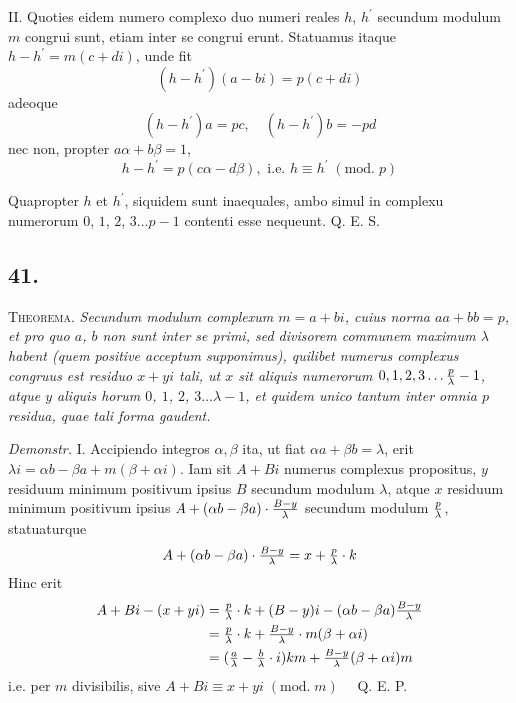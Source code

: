 \documentclass[twoside,12pt]{memoir}
\renewcommand{\pmod}[1]{\;(\textrm{mod.}\;#1)}
\let\oldfrac\frac
\def\frac#1#2{\mathchoice{\tfrac{#1}{#2}}{\oldfrac{#1}{#2}}{\genfrac{}{}{}{2}{#1}{#2\mathstrut}}{\genfrac{}{}{}{3}{#1}{#2\mathstrut}}}
\begin{document}
II. Quoties eidem numero complexo duo numeri reales \(h\), \(h^{\prime}\) secundum modulum \(m\) congrui sunt, etiam inter se congrui erunt. Statuamus itaque \(h-h^{\prime}=m(c+d i)\), unde fit
\[(h-h^{\prime})(a-b i)=p(c+d i)\]
adeoque
\[(h-h^{\prime}) a=p c, \quad (h-h^{\prime}) b=-p d\]
nec non, propter \(a \alpha+b \beta=1\),
\[h-h^{\prime}=p(c \alpha-d \beta), \text{ i.e. } h \equiv h^{\prime}\pmod{p}\]
 
Quapropter \(h\) et \(h^{\prime}\), siquidem sunt inaequales, ambo simul in complexu numerorum \(0\), \(1\), \(2\), \(3 \ldots p-1\) contenti esse nequeunt. Q. E. S.

\subsection*{41.}
 
\textsc{Theorema.}\textit{ Secundum modulum complexum \(m=a+b i\), cuius norma \(a a+b b=p\), et pro quo \(a\), \(b\) non sunt inter se primi, sed divisorem communem maximum \(\lambda\) habent (quem positive acceptum supponimus), quilibet numerus complexus congruus est residuo \(x+y i\) tali, ut \(x\) sit aliquis numerorum \(0,1,2,3 \ldots \frac{p}{\lambda}-1\), atque \(y\) aliquis horum \(0\), \(1\), \(2\), \(3 \ldots \lambda-1\), et quidem unico tantum inter omnia \(p\) residua, quae tali forma gaudent.}\pagebreak%
 
\textit{Demonstr.} I. Accipiendo integros \(\alpha, \beta\) ita, ut fiat \(\alpha a+\beta b=\lambda\), erit \(\lambda i=\alpha b-\beta a+m(\beta+\alpha i)\). Iam sit \(A+B i\) numerus complexus propositus, \(y\) residuum minimum positivum ipsius \(B\) secundum modulum \(\lambda\), atque \(x\) residuum minimum positivum ipsius \(A+(\alpha b-\beta a) \cdot \frac{B-y}{\lambda}\) secundum modulum \(\frac{p}{\lambda}\), statuaturque
\[A+(\alpha b-\beta a) \cdot \frac{B-y}{\lambda}=x+\frac{p}{\lambda} \cdot k\]
Hinc erit
\[\begin{aligned}
A+B i-(x+y i) & =\frac{p}{\lambda} \cdot k+(B-y) i-(\alpha b-\beta a) \frac{B-y}{\lambda} \\
& =\frac{p}{\lambda} \cdot k+\frac{B-y}{\lambda} \cdot m(\beta+\alpha i) \\
& =(\frac{a}{\lambda}-\frac{b}{\lambda} \cdot i) k m+\frac{B-y}{\lambda}(\beta+\alpha i) m
\end{aligned}\]
i.e. per \(m\) divisibilis, sive \(A+B i \equiv x+y i\pmod{m} \quad\) Q. E. P.
 
\end{document}
